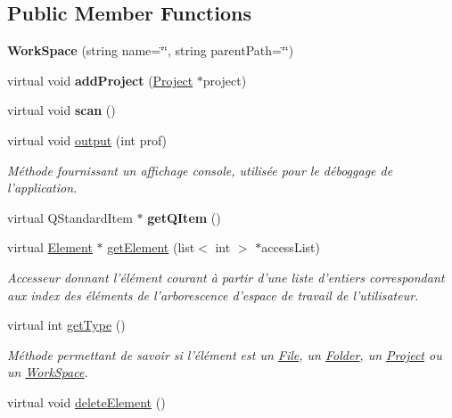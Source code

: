 \subsection*{Public Member Functions}
\begin{DoxyCompactItemize}
\item 
\hypertarget{class_work_space_a1661fe19f2b3923b069e4a6d38ca1d08}{
{\bfseries WorkSpace} (string name=\char`\"{}\char`\"{}, string parentPath=\char`\"{}\char`\"{})}
\label{class_work_space_a1661fe19f2b3923b069e4a6d38ca1d08}

\item 
\hypertarget{class_work_space_a6ebbbb6649935f8da3eb15027b4d84e0}{
virtual void {\bfseries addProject} (\hyperlink{class_project}{Project} $\ast$project)}
\label{class_work_space_a6ebbbb6649935f8da3eb15027b4d84e0}

\item 
\hypertarget{class_work_space_a00269f301468948ffbd2572f5a9621f0}{
virtual void {\bfseries scan} ()}
\label{class_work_space_a00269f301468948ffbd2572f5a9621f0}

\item 
virtual void \hyperlink{class_work_space_a37e6167ee95031e9d0391dcbc7d669cf}{output} (int prof)
\begin{DoxyCompactList}\small\item\em Méthode fournissant un affichage console, utilisée pour le déboggage de l'application. \item\end{DoxyCompactList}\item 
\hypertarget{class_work_space_a825876cbe7e04e21b8b0e0fbfa5247af}{
virtual QStandardItem $\ast$ {\bfseries getQItem} ()}
\label{class_work_space_a825876cbe7e04e21b8b0e0fbfa5247af}

\item 
virtual \hyperlink{class_element}{Element} $\ast$ \hyperlink{class_work_space_a4326db6270096edb30d8e42e390424d4}{getElement} (list$<$ int $>$ $\ast$accessList)
\begin{DoxyCompactList}\small\item\em Accesseur donnant l'élément courant à partir d'une liste d'entiers correspondant aux index des éléments de l'arborescence d'espace de travail de l'utilisateur. \item\end{DoxyCompactList}\item 
virtual int \hyperlink{class_work_space_a15067a1630061db9f73168ef81ea0dff}{getType} ()
\begin{DoxyCompactList}\small\item\em Méthode permettant de savoir si l'élément est un \hyperlink{class_file}{File}, un \hyperlink{class_folder}{Folder}, un \hyperlink{class_project}{Project} ou un \hyperlink{class_work_space}{WorkSpace}. \item\end{DoxyCompactList}\item 
\hypertarget{class_work_space_a2ec0e9fa5802767f3c8bfccb3d48ce8a}{
virtual void \hyperlink{class_work_space_a2ec0e9fa5802767f3c8bfccb3d48ce8a}{deleteElement} ()}
\label{class_work_space_a2ec0e9fa5802767f3c8bfccb3d48ce8a}


\end{DoxyCompactItemize}
